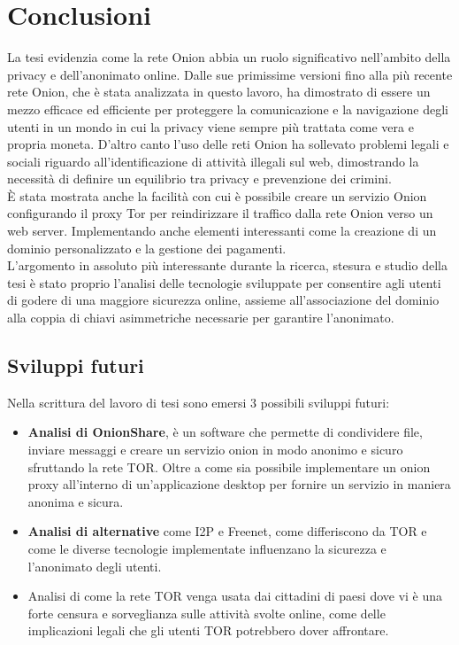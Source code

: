 \chapter{Conclusioni}

La tesi evidenzia come la rete Onion abbia un ruolo significativo nell'ambito della privacy e dell'anonimato online. 
Dalle sue primissime versioni fino alla più recente rete Onion, che è stata analizzata in questo lavoro, ha dimostrato di essere un mezzo efficace ed efficiente per proteggere la comunicazione e la navigazione degli utenti in un mondo in cui la privacy viene sempre più trattata come vera e propria moneta.
D'altro canto l'uso delle reti Onion ha sollevato problemi legali e sociali riguardo all'identificazione di attività illegali sul web, dimostrando la necessità di definire un equilibrio tra privacy e prevenzione dei crimini.
\\

È stata mostrata anche la facilità con cui è possibile creare un servizio Onion configurando il proxy Tor per reindirizzare il traffico dalla rete Onion verso un web server. 
Implementando anche elementi interessanti come la creazione di un dominio personalizzato e la gestione dei pagamenti.
\\

L'argomento in assoluto più interessante durante la ricerca, stesura e studio della tesi è stato proprio l'analisi delle tecnologie sviluppate per consentire agli utenti di godere di una maggiore sicurezza online, assieme all'associazione del dominio alla coppia di chiavi asimmetriche necessarie per garantire l'anonimato. 

\section{Sviluppi futuri}
Nella scrittura del lavoro di tesi sono emersi 3 possibili sviluppi futuri:
\begin{itemize}
    \item \textbf{Analisi di OnionShare}, è un software che permette di condividere file, inviare messaggi e creare un servizio onion in modo anonimo e sicuro sfruttando la rete TOR. Oltre a come sia possibile implementare un onion proxy all'interno di un'applicazione desktop per fornire un servizio in maniera anonima e sicura.
    \item \textbf{Analisi di alternative} come I2P e Freenet, come differiscono da TOR e come le diverse tecnologie implementate influenzano la sicurezza e l'anonimato degli utenti.
    \item Analisi di come la rete TOR venga usata dai cittadini di paesi dove vi è una forte censura e sorveglianza sulle attività svolte online, come delle implicazioni legali che gli utenti TOR potrebbero dover affrontare. 
\end{itemize}
